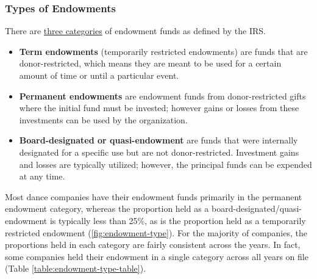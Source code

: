 \documentclass[Dance Data
Project,article,submit,moreauthors,pdftex]{mdpi}
\begin{document}
\hypertarget{types-of-endowments}{%
\subsubsection{Types of Endowments}\label{types-of-endowments}}

There are \href{https://www.irs.gov/instructions/i990sd}{three
categories} of endowment funds as defined by the IRS.

\begin{itemize}
\item \textbf{Term endowments} (temporarily restricted endowments) are funds that are donor-restricted, which means they are meant to be used for a certain amount of time or until a particular event. 
\item \textbf{Permanent endowments} are endowment funds from donor-restricted gifts where the initial fund must be invested; however gains or losses from these investments can be used by the organization.  
\item \textbf{Board-designated or quasi-endowment} are funds that were internally designated for a specific use but are not donor-restricted.  Investment gains and losses are typically utilized; however, the principal funds can be expended at any time.
\end{itemize}

Most dance companies have their endowment funds primarily in the
permanent endowment category, whereas the proportion held as a
board-designated/quasi-endowment is typically less than 25\%, as is the
proportion held as a temporarily restricted endowment
(\ref{fig:endowment-type}). For the majority of companies, the
proportions held in each category are fairly consistent across the
years. In fact, some companies held their endowment in a single category
across all years on file (Table \ref{table:endowment-type-table}).
\end{document}
